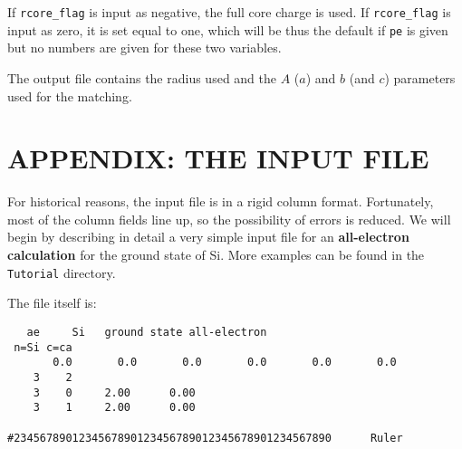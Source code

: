 \documentclass[11pt]{article}
\begin{document}
If {\tt rcore\_flag} is input as negative, the full core charge is used.
If {\tt rcore\_flag} is input as zero, it is set equal to one, which will be
thus the default if {\tt pe} is given but no numbers are given for these
two variables.

The output file contains the radius used and the $A$ ($a$) and $b$ (and $c$)
parameters used for the matching.




\section{APPENDIX: THE INPUT FILE}
\label{sec:inputfile}

For historical reasons, the input file is in a rigid column
format. Fortunately, most of the column fields line up, so the
possibility of errors is reduced.  We will begin by describing in
detail a very simple input file for an {\bf all-electron calculation} for
the ground state of Si. More examples can be found in the {\tt
Tutorial} directory.

The file itself is:
\begin{verbatim}
   ae     Si   ground state all-electron
 n=Si c=ca
       0.0       0.0       0.0       0.0       0.0       0.0
    3    2
    3    0     2.00      0.00
    3    1     2.00      0.00

#2345678901234567890123456789012345678901234567890      Ruler
\end{verbatim}
\end{document}
